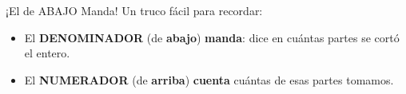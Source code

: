 \documentclass[12pt,letterpaper]{article}
\begin{document}
	
	\begin{truco}{¡El de ABAJO Manda!}
		Un truco fácil para recordar:
		\begin{itemize}[leftmargin=*,itemsep=2pt]
			\item El \textcolor{valorange}{\textbf{DENOMINADOR}} (de \textbf{abajo})
			\textbf{manda}: dice en cuántas partes se cortó el entero.
			\item El \textcolor{valblue}{\textbf{NUMERADOR}} (de \textbf{arriba})
			\textbf{cuenta} cuántas de esas partes tomamos.
		\end{itemize}
	\end{truco}
	
	
\end{document}
